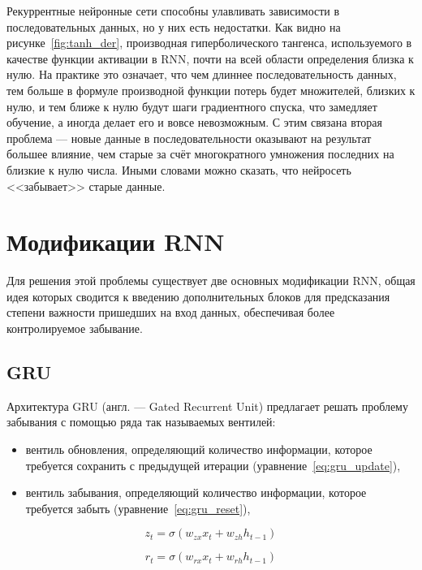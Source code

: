 Рекуррентные нейронные сети способны улавливать зависимости в последовательных данных, но у них есть недостатки. Как видно на рисунке \ref*{fig:tanh_der}, производная гиперболического тангенса, используемого в качестве функции активации в RNN, почти на всей области определения близка к нулю. На практике это означает, что чем длиннее последовательность данных, тем больше в формуле производной функции потерь будет множителей, близких к нулю, и тем ближе к нулю будут шаги градиентного спуска, что замедляет обучение, а иногда делает его и вовсе невозможным. С этим связана вторая проблема --- новые данные в последовательности оказывают на результат большее влияние, чем старые за счёт многократного умножения последних на близкие к нулю числа. Иными словами можно сказать, что нейросеть <<забывает>> старые данные.

\section{Модификации RNN}

Для решения этой проблемы существует две основных модификации RNN, общая идея которых сводится к введению дополнительных блоков для предсказания степени важности пришедших на вход данных, обеспечивая более контролируемое забывание.

\subsection{GRU}

Архитектура GRU (англ. --- Gated Recurrent Unit) предлагает решать проблему забывания с помощью ряда так называемых вентилей:
\begin{itemize}
    \item вентиль обновления, определяющий количество информации, которое требуется сохранить с предыдущей итерации (уравнение \ref*{eq:gru_update}),
    \item вентиль забывания, определяющий количество информации, которое требуется забыть (уравнение \ref*{eq:gru_reset}),
\end{itemize}

\begin{equation}
    \label{eq:gru_update}
    z_t = \sigma(w_{zx}x_t+w_{zh}h_{t-1})
\end{equation}

\begin{equation}
    \label{eq:gru_reset}
    r_t = \sigma(w_{rx}x_t+w_{rh}h_{t-1})
\end{equation}

